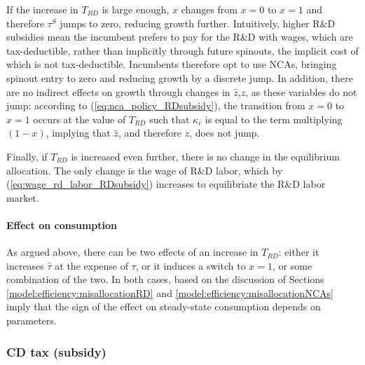 \documentclass[11pt,english]{article}
\begin{document}
If the increase in $T_{RD}$ is large enough, $x$ changes from $x = 0$ to $x = 1$ and therefore $\tau^S$ jumps to zero, reducing growth further. Intuitively, higher R\&D subsidies mean the incumbent prefers to pay for the R\&D with wages, which are tax-deductible, rather than implicitly through future spinouts, the implicit cost of which is not tax-deductible. Incumbents therefore opt to use NCAs, bringing spinout entry to zero and reducing growth by a discrete jump. In addition, there are no indirect effects on growth through changes in $\hat{z}$,$z$, as these variables do not jump: according to (\ref{eq:nca_policy_RDsubsidy}), the transition from $x= 0$ to $x =1$ occurs at the value of $T_{RD}$ such that $\kappa_c$ is equal to the term multiplying $(1-x)$, implying that $\hat{z}$, and therefore $z$, does not jump.

Finally, if $T_{RD}$ is increased even further, there is no change in the equilibrium allocation. The only change is the wage of R\&D labor, which by (\ref{eq:wage_rd_labor_RDsubsidy}) increases to equilibriate the R\&D labor market.

\paragraph{Effect on consumption}

As argued above, there can be two effects of an increase in $T_{RD}$: either it increases $\hat{\tau}$ at the expense of $\tau$, or it induces a switch to $x = 1$, or some combination of the two. In both cases, based on the discussion of Sections \ref{model:efficiency:misallocationRD} and \ref{model:efficiency:misallocationNCAs} imply that the sign of the effect on steady-state consumption depends on parameters.

\subsubsection{CD tax (subsidy)}
\end{document}
